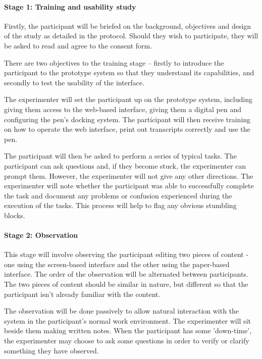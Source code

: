 
\paragraph{Stage 1: Training and usability study}
Firstly, the participant will be briefed on the background, objectives and
design of the study as detailed in the protocol.  Should they wish to
participate, they will be asked to read and agree to the consent form.

There are two objectives to the training stage – firstly to introduce the
participant to the prototype system so that they understand its capabilities,
and secondly to test the usability of the interface.

The experimenter will set the participant up on the prototype system, including
giving them access to the web-based interface, giving them a digital pen and
configuring the pen’s docking system. The participant will then receive
training on how to operate the web interface, print out transcripts correctly
and use the pen.

The participant will then be asked to perform a series of typical tasks. The
participant can ask questions and, if they become stuck, the experimenter can
prompt them. However, the experimenter will not give any other directions. The
experimenter will note whether the participant was able to successfully
complete the task and document any problems or confusion experienced during the
execution of the tasks. This process will help to flag any obvious stumbling
blocks.

\paragraph{Stage 2: Observation}

This stage will involve observing the participant editing two pieces of content
- one using the screen-based interface and the other using the paper-based
interface. The order of the observation will be alternated between
participants. The two pieces of content should be similar in nature, but
different so that the participant isn't already familiar with the content.

The observation will be done passively to allow natural interaction with the
system in the participant's normal work environment. The experimenter will sit
beside them making written notes. When the participant has some 'down-time',
the experimenter may choose to ask some questions in order to verify or clarify
something they have observed.

